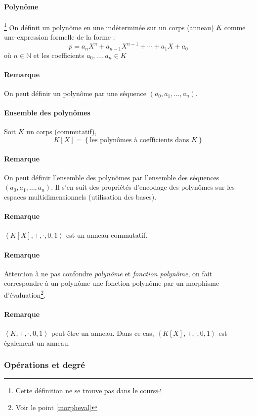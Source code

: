 \documentclass[a4paper,10pt]{article}
\newcommand{\grp}[1]{\left\langle #1 \right\rangle} %
\newcommand{\set}[1]{\left\lbrace #1 \right\rbrace } %
\newcommand{\NN}{\mathbb{N}} %
\begin{document}
   \paragraph{Polynôme}\footnote{Cette définition ne se trouve pas dans le cours}
    On définit un polynôme en une indéterminée sur un corps (anneau) $K$ comme une expression formelle de la forme : 
     $$p=a_n X^n + a_{n-1} X^{n-1} + \cdots + a_1 X + a_0$$
    où $n\in \NN$ et les coefficients $a_0, \hdots, a_n \in K$
   \paragraph{Remarque} On peut définir un polynôme par une séquence $(a_0, a_1, \hdots, a_n)$.

   \paragraph{Ensemble des polynômes}
    Soit $K$ un corps (commutatif),
     $$K[X]=\set{\text{les polynômes à coefficients dans } K}$$
   \paragraph{Remarque} On peut définir l'ensemble des polynômes par l'ensemble des séquences $(a_0, a_1, \hdots, a_n)$. Il s'en suit des propriétés d'encodage des polynômes sur les espaces multidimensionnels (utilisation des bases).
   \paragraph{Remarque} $\grp{K[X],+,\cdot,0,1}$ est un anneau commutatif.
   \paragraph{Remarque} Attention à ne pas confondre \textit{polynôme} et \textit{fonction polynôme}, on fait correspondre à un polynôme une fonction polynôme par un morphisme d'évaluation\footnote{Voir le point \ref{morpheval}}.%
   \paragraph{Remarque} $\grp{K, +, \cdot, 0, 1}$ peut être un anneau. Dans ce cas, $\grp{K[X],+,\cdot,0,1}$ est également un anneau.

  \subsubsection{Opérations et degré}
\end{document}
